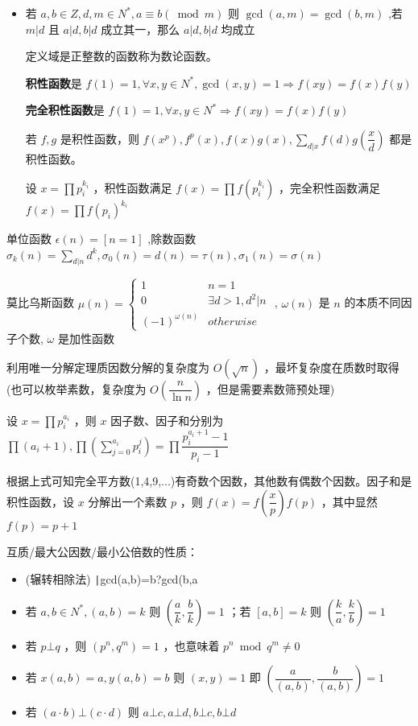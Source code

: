 \documentclass[twocolumn,10pt]{ctexart}
\begin{document}
\begin{itemize}
\item 若 $a,\allowbreak{}b\in Z,\allowbreak{}d,\allowbreak{}m\in N^*,\allowbreak{}a\equiv b(\bmod m)$ 则 $\gcd(a,m)=\gcd(b,m)$ ,若 $m|d$ 且 $a|d,b|d$ 成立其一，那么 $a|d,b|d$ 均成立

定义域是正整数的函数称为数论函数。

\textbf{积性函数}是 $f(1)=1,\allowbreak{}\forall x,\allowbreak{}y\in N^*,\allowbreak{}\gcd(x,\allowbreak{}y)=1\Rightarrow f(xy)=f(x)f(y)$

\textbf{完全积性函数}是  $f(1)=1,\allowbreak{}\forall x,\allowbreak{}y\in N^*\Rightarrow f(xy)=f(x)f(y)$

若 $f,g$ 是积性函数，则 $f(x^p),\allowbreak{}f^p(x),\allowbreak{}f(x)g(x),\allowbreak{}\sum_{d|x}f(d)g(\dfrac xd)$ 都是积性函数。

设 $x=\prod p_i^{k_i}$ ，积性函数满足 $f(x)=\prod f(p_i^{k_i})$ ，完全积性函数满足 $f(x)=\prod f(p_i)^{k_i}$
\end{itemize}

\begin{notebox}
单位函数 $\epsilon(n)=[n=1]$ ,除数函数 $\sigma_k(n)=\sum_{d|n}d^k,\allowbreak{}\sigma_0(n)=d(n)=\tau(n),\allowbreak{}\sigma_1(n)=\sigma(n)$

莫比乌斯函数 $\mu(n)=\begin{cases}1&n=1\\0&\exists d > 1,d^2|n\\(-1)^{\omega(n)}&otherwise\end{cases}$ , $\omega(n)$ 是 $n$ 的本质不同因子个数, $\omega$ 是加性函数

利用唯一分解定理质因数分解的复杂度为 $O(\sqrt n)$ ，最坏复杂度在质数时取得 (也可以枚举素数，复杂度为 $O(\dfrac{n}{\ln n})$ ，但是需要素数筛预处理)
\end{notebox}

设 $x=\prod p_i^{a_i}$ ，则 $x$ 因子数、因子和分别为 $\prod(a_i+1),\allowbreak{}\prod(\sum_{j=0}^{a_i}p_i^j)=\prod\dfrac{p_i^{a_i+1}-1}{p_i-1}$

\begin{notebox}
根据上式可知完全平方数(1,4,9,...)有奇数个因数，其他数有偶数个因数。因子和是积性函数，设 $x$ 分解出一个素数 $p$ ，则 $f(x)=f(\dfrac xp)f(p)$ ，其中显然 $f(p)=p+1$
\end{notebox}

互质/最大公因数/最小公倍数的性质：

\begin{itemize}
\item (辗转相除法) \texttt|gcd(a,b)=b?gcd(b,a%
\item 若 $a,b\in N^*,(a,b)=k$ 则 $(\dfrac ak,\dfrac bk)=1$ ；若 $[a,b]=k$ 则 $(\dfrac ka,\dfrac kb)=1$
\item 若 $p\bot q$ ，则 $(p^n,q^m)=1$ ，也意味着 $p^n\bmod q^m\neq 0$
\item 若 $x(a,b)=a,y(a,b)=b$ 则 $(x,y)=1$ 即 $(\dfrac{a}{(a,\allowbreak{}b)},\allowbreak{}\dfrac{b}{(a,\allowbreak{}b)})=1$
\item 若 $(a\cdot b)\bot(c\cdot d)$ 则 $a\bot c,\allowbreak{}a\bot d,\allowbreak{}b\bot c,\allowbreak{}b\bot d$
\end{itemize}
\end{document}
